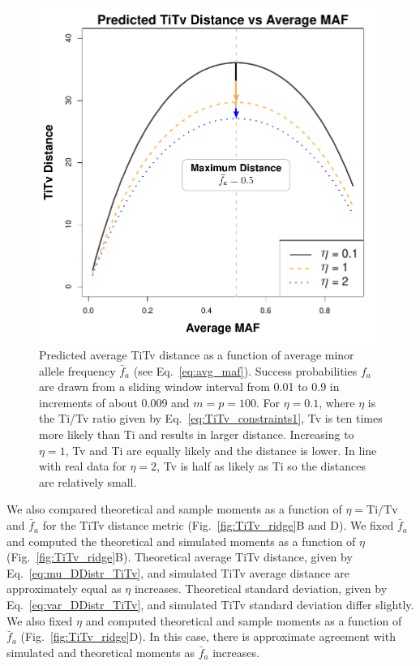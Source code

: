 \documentclass[aos]{imsart}
\begin{document}
\begin{figure}[H]
\begin{minipage}[c]{0.65\textwidth}
	\includegraphics[width=0.98\textwidth]{TiTv_distance-vs-maf.pdf}
\end{minipage}\hfill
\begin{minipage}[c]{0.35\textwidth}
	\caption{Predicted average TiTv distance as a function of average minor allele frequency $\bar{f}_a$ (see Eq.~\ref{eq:avg_maf}). Success probabilities $f_a$ are drawn from a sliding window interval from 0.01 to 0.9 in increments of about 0.009 and $m=p=100$. For $\eta=0.1$, where $\eta$ is the Ti/Tv ratio given by Eq.~\ref{eq:TiTv_constraints1}, Tv is ten times more likely than Ti and results in larger distance. Increasing to $\eta=1$, Tv and Ti are equally likely and the distance is lower.  In line with real data for $\eta=2$, Tv is half as likely as Ti so the distances are relatively small.}\label{fig:TiTv-vs-maf}
\end{minipage}
\end{figure}

We also compared theoretical and sample moments as a function of $\eta = \text{Ti/Tv}$ and $\bar{f}_a$ for the TiTv distance metric (Fig.~\ref{fig:TiTv_ridge}B and D). We fixed $\bar{f}_a$ and computed the theoretical and simulated moments as a function of $\eta$ (Fig.~\ref{fig:TiTv_ridge}B). Theoretical average TiTv distance, given by Eq.~\ref{eq:mu_DDistr_TiTv}, and simulated TiTv average distance are approximately equal as $\eta$ increases. Theoretical standard deviation, given by Eq.~\ref{eq:var_DDistr_TiTv}, and simulated TiTv standard deviation differ slightly. We also fixed $\eta$ and computed theoretical and sample moments as a function of $\bar{f}_a$ (Fig.~\ref{fig:TiTv_ridge}D). In this case, there is approximate agreement with simulated and theoretical moments as $\bar{f}_a$ increases.
\end{document}
